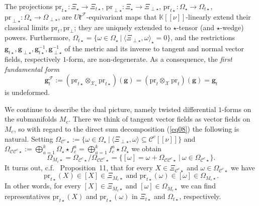 \documentclass[a4paper,11pt]{article}
\begin{document}
The projections $\mathrm{pr}_{t\star}\colon\Xi_\star\rightarrow\Xi_{t\star}$,
$\mathrm{pr}_{\perp\star}\colon\Xi_\star\rightarrow\Xi_{\perp\star}$,
$\mathrm{pr}_{t\star}\colon\Omega_\star\rightarrow\Omega_{t\star}$,
$\mathrm{pr}_{\perp\star}\colon\Omega_\star\rightarrow\Omega_{\perp\star}$,
are $U\mathfrak{k}^\mathcal{F}$-equivariant maps that $\mathbb{K}[[\nu]]$-linearly extend their classical limits 
$\mathrm{pr}_t,\mathrm{pr}_\perp$; they are uniquely extended to $\star$-tensor (and $\star$-wedge) powers.
Furthermore, $\Omega_{t\star}=\{\omega\in\Omega_\star~|~
\langle\Xi_{\perp\star},\omega\rangle_\star=0\}$, and the restrictions
$\mathbf{g}_{t\star},\mathbf{g}_{\perp\star},\mathbf{g}^{-1}_{t\star},
\mathbf{g}^{-1}_{\perp\star}$ of the metric and its inverse to tangent and normal
vector fields, respectively $1$-form, are non-degenerate.
As a consequence, the \textit{first fundamental form}
\begin{equation}
    \mathbf{g}_t^\mathcal{F}:=(\mathrm{pr}_{t\star}\otimes_{\mathcal{X}_\star}
    \mathrm{pr}_{t\star})(\mathbf{g})
    =(\mathrm{pr}_{t}\otimes_{\mathcal{X}}
    \mathrm{pr}_{t})(\mathbf{g})
    =\mathbf{g}_t
\end{equation}
is undeformed.

We continue to describe the dual picture, namely twisted differential $1$-forms on the
submanifolds $M_c$. There we think of tangent vector fields as vector fields on
$M_c$, so with regard to the direct sum decomposition (\ref{eq08})
the following is natural. Setting $\Omega_{\mathcal{C}^c\star}
:=\{\omega\in\Omega_\star~|~\langle\Xi_{\perp\star},\omega\rangle
\subseteq\mathcal{C}^c[[\nu]]\}$ and $\Omega_{\mathcal{C}\mathcal{C}^c\star}
:=\bigoplus_{a=1}^k\Omega_\star\star f^a_c=\bigoplus_{a=1}^kf^a_c\star\Omega_\star$ we obtain
\begin{equation}
    \Omega_{M_c\star}
    =\Omega_{\mathcal{C}^c\star}/\Omega_{\mathcal{C}\mathcal{C}^c\star}
    =\{[\omega]=\omega+\Omega_{\mathcal{C}\mathcal{C}^c\star}~|~
    \omega\in\Omega_{\mathcal{C}^c\star}\}.
\end{equation}
It turns out, c.f. \cite{FioreWeber}~Proposition~11, that for every
$X\in\Xi_{\mathcal{C}^c\star}$ and $\omega\in\Omega_{\mathcal{C}^c\star}$ we have
\begin{equation}
    \mathrm{pr}_{t\star}(X)\in[X]\in\Xi_{M_c\star}
    \text{ and }
    \mathrm{pr}_{t\star}(\omega)\in[\omega]\in\Omega_{M_c\star}.
\end{equation}
In other words, for every $[X]\in\Xi_{M_c\star}$ and $[\omega]\in\Omega_{M_c\star}$
we can find representatives $\mathrm{pr}_{t\star}(X)$ and 
$\mathrm{pr}_{t\star}(\omega)$ in $\Xi_{t\star}$ and $\Omega_{t\star}$,
respectively.
\end{document}
